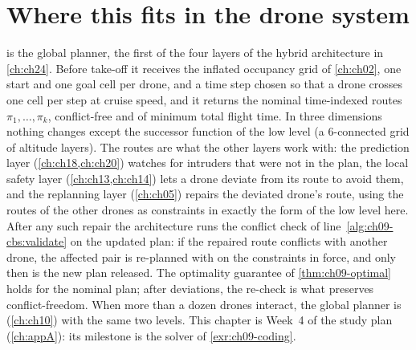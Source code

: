 \section{Where this fits in the drone system}
\label{sec:ch09-drone}
\begin{dronebox}
\cbs is the global planner, the first of the four layers of the
hybrid architecture in \cref{ch:ch24}. Before take-off it receives the
inflated occupancy grid of \cref{ch:ch02}, one start and one goal cell per
drone, and a time step chosen so that a drone crosses one cell per step at
cruise speed, and it returns the nominal time-indexed routes
$\pi_1, \dots, \pi_k$, conflict-free and of minimum total flight time. In
three dimensions nothing changes except the successor function of the low
level (a 6-connected grid of altitude layers). The routes are what the
other layers work with: the prediction layer (\cref{ch:ch18,ch:ch20})
watches for intruders that were not in the plan, the local safety layer
(\cref{ch:ch13,ch:ch14}) lets a drone deviate from its route to avoid them,
and the replanning layer (\cref{ch:ch05}) repairs the deviated drone's
route, using the routes of the other drones as constraints in exactly the
form of the low level here. After any such repair the architecture runs the
conflict check of line~\ref{alg:ch09-cbs:validate} on the updated plan: if
the repaired route conflicts with another drone, the affected pair is
re-planned with \cbs on the constraints in force, and only then is the new
plan released. The optimality guarantee of \cref{thm:ch09-optimal} holds
for the nominal plan; after deviations, the re-check is what preserves
conflict-freedom. When more than a dozen drones interact, the global planner
is \ecbs (\cref{ch:ch10}) with the same two levels. This chapter is Week~4
of the study plan (\cref{ch:appA}): its milestone is the solver of
\cref{exr:ch09-coding}.
\end{dronebox}

